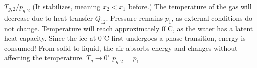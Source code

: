 \( T_{g,2} / p_{g,2} \)  
(It stabilizes, meaning \( x_2 < x_1 \) before.)  
The temperature of the gas will decrease due to heat transfer \( Q_{12} \).  
Pressure remains \( p_1 \), as external conditions do not change.  
Temperature will reach approximately \( 0^\circ \text{C} \), as the water has a latent heat capacity.  
Since the ice at \( 0^\circ \text{C} \) first undergoes a phase transition, energy is consumed!  
From solid to liquid, the air absorbs energy and changes without affecting the temperature.  
\( T_{g} \to 0^\circ \)  
\( p_{g,2} = p_1 \)